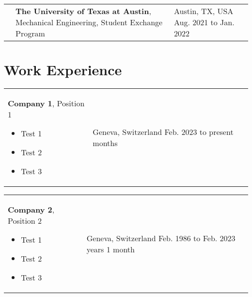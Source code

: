 \documentclass[10pt, a4paper]{article}
\newenvironment{highlights}{
        \begin{itemize}[
                topsep=0pt,
                parsep=0.07 cm,
                partopsep=0pt,
                itemsep=0pt,
                after=\vspace*{-1\baselineskip},
                leftmargin=0.6 cm + 3pt
            ]
    }{
        \end{itemize}
    } %
\begin{document}
        \vspace*{0.12 cm}
        
        \begin{tabularx}{\textwidth}{p{0.55cm} K{0.2 cm} R{3.6 cm}}
            \textbf{}
            & 
            \textbf{The University of Texas at Austin}, Mechanical Engineering, Student Exchange Program
            \vspace*{0.12 cm}
        &
            Austin, TX, USA  \hspace*{-0.2cm + 0.2 cm} \newline
            Aug. 2021 to Jan. 2022 \hspace*{-0.2cm + 0.2 cm}
        \end{tabularx}


    \section{Work Experience}
        \begin{tabularx}{\textwidth}{K{0.2 cm} R{3.6 cm}}
            \textbf{Company 1}, Position 1
            \vspace*{0.12 cm}
            \begin{highlights}
                \item Test 1
                \item Test 2
                \item Test 3
            \end{highlights}
        &
            Geneva, Switzerland  \hspace*{-0.2cm + 0.2 cm} \newline
            Feb. 2023 to present  \hspace*{-0.2cm + 0.2 cm}  months \hspace*{-0.2cm + 0.2 cm}
        \end{tabularx}

        \vspace*{0.12 cm}
        
        \begin{tabularx}{\textwidth}{K{0.2 cm} R{3.6 cm}}
            \textbf{Company 2}, Position 2
            \vspace*{0.12 cm}
            \begin{highlights}
                \item Test 1
                \item Test 2
                \item Test 3
            \end{highlights}
        &
            Geneva, Switzerland  \hspace*{-0.2cm + 0.2 cm} \newline
            Feb. 1986 to Feb. 2023  \hspace*{-0.2cm + 0.2 cm}  years 1 month \hspace*{-0.2cm + 0.2 cm}
        \end{tabularx}
\end{document}
